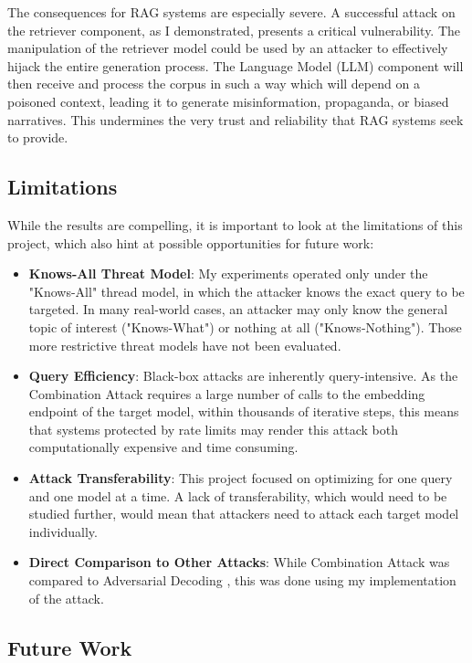 \documentclass[a4paper, sigconf]{acmart}
\begin{document}
The consequences for RAG systems are especially severe. A successful attack on the retriever component, as I demonstrated, presents a critical vulnerability. The manipulation of the retriever model could be used by an attacker to effectively hijack the entire generation process. The Language Model (LLM) component will then receive and process the corpus in such a way which will depend on a poisoned context, leading it to generate misinformation, propaganda, or biased narratives. This undermines the very trust and reliability that RAG systems seek to provide. 


\subsection{Limitations}

While the results are compelling, it is important to look at the limitations of this project, which also hint at possible opportunities for future work:

\begin{itemize}
  \item \textbf{Knows-All Threat Model}: My experiments operated only under the "Knows-All" thread model, in which the attacker knows the exact query to be targeted. In many real-world cases, an attacker may only know the general topic of interest ("Knows-What") or nothing at all ("Knows-Nothing"). Those more restrictive threat models have not been evaluated.
  \item \textbf{Query Efficiency}: Black-box attacks are inherently query-intensive. As the Combination Attack requires a large number of calls to the embedding endpoint of the target model, within thousands of iterative steps, this means that systems protected by rate limits may render this attack both computationally expensive and time consuming. 
  \item \textbf{Attack Transferability}: This project focused on optimizing for one query and one model at a time. A lack of transferability, which would need to be studied further, would mean that attackers need to attack each target model individually. 
  \item \textbf{Direct Comparison to Other Attacks}: While Combination Attack was compared to Adversarial Decoding \cite{zhang2025-adv}, this was done using my implementation of the attack. 
\end{itemize}


\subsection{Future Work}
\end{document}

